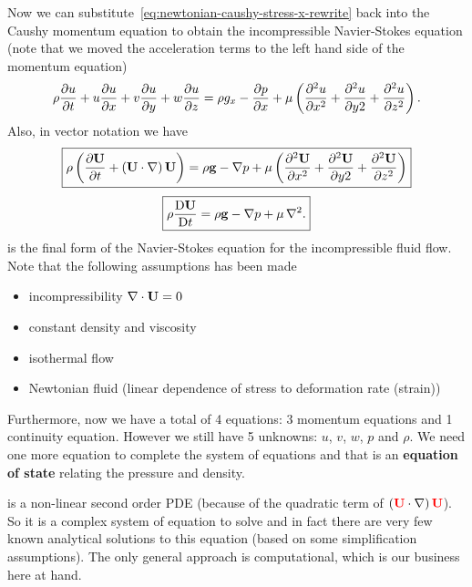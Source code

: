 Now we can substitute~\cref{eq:newtonian-caushy-stress-x-rewrite} back into the Caushy momentum equation to obtain the incompressible Navier-Stokes equation (note that we moved the acceleration terms to the left hand side of the momentum equation)
%
\begin{equation}
    \rho \frac{\partial u}{\partial t} + u\frac{\partial u}{\partial x} + v\frac{\partial u}{\partial y} + w\frac{\partial u}{\partial z} = \rho g_x - \frac{\partial p}{\partial x} + \mu \left( \frac{\partial^2 u}{\partial x^2} + \frac{\partial^2 u}{\partial y2} + \frac{\partial^2 u}{\partial z^2} \right).
  \label{eq:incompressible-navier-stokes}
\end{equation}
%
Also, in vector notation we have
\begin{equation}
  \boxed{
    \rho \left( \frac{\partial \mathbf{U}}{\partial t} + \left( \mathbf{U} \cdot \mathop{}\!\nabla \right) \mathbf{U} \right) = \rho \mathbf{g} - \mathop{}\!\nabla p + \mu \left( \frac{\partial^2 \mathbf{U}}{\partial x^2} + \frac{\partial^2 \mathbf{U}}{\partial y2} + \frac{\partial^2 \mathbf{U}}{\partial z^2} \right)
  }
  \label{eq:incompressible-navier-stokes-vector-notation}
\end{equation}
%
\begin{equation}
  \boxed{
    \rho \frac{\mathop{}\!\mathrm{D} \mathbf{U}}{\mathop{}\!\mathrm{D} t} = \rho \mathbf{g} - \mathop{}\!\nabla p + \mu \mathop{}\!\nabla^2.
  }
  \label{eq:incompressible-navier-stokes-vector-notation-condensed}
\end{equation}
%
 is the final form of the Navier-Stokes equation for the incompressible fluid flow.
Note that the following assumptions has been made
%
\begin{itemize}
  \item incompressibility \(\mathop{}\!\nabla \cdot \mathbf{U}  = 0\)
  \item constant density and viscosity
  \item isothermal flow
  \item Newtonian fluid (linear dependence of stress to deformation rate (strain))
\end{itemize}

Furthermore, now we have a total of 4 equations: 3 momentum equations and 1 continuity equation.
However we still have 5 unknowns: $u$, $v$, $w$, $p$ and $\rho$.
We need one more equation to complete the system of equations and that is an \textbf{equation of state} relating the pressure and density.

\begin{remark}
   is a non-linear second order PDE (because of the quadratic term of \( \left( \textcolor{red}{\mathbf{U}} \cdot \mathop{}\!\nabla \right) \textcolor{red}{\mathbf{U}} \)).
  So it is a complex system of equation to solve and in fact there are very few known analytical solutions to this equation (based on some simplification assumptions).
  The only general approach is computational, which is our business here at hand.
\end{remark}



